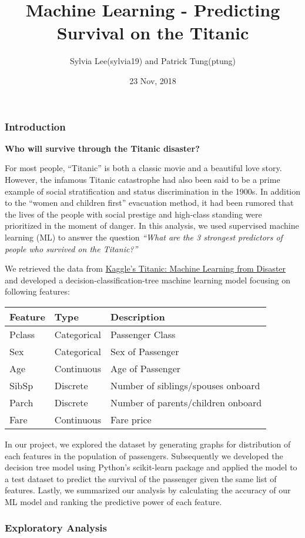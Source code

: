 \documentclass[]{article}
\title{Machine Learning - Predicting Survival on the Titanic}
\author{Sylvia Lee(sylvia19) and Patrick Tung(ptung)}
\date{23 Nov, 2018}
\begin{document}
\maketitle

\subsubsection{Introduction}\label{introduction}

\textbf{Who will survive through the Titanic disaster?}

For most people, ``Titanic'' is both a classic movie and a beautiful
love story. However, the infamous Titanic catastrophe had also been said
to be a prime example of social stratification and status discrimination
in the 1900s. In addition to the ``women and children first'' evacuation
method, it had been rumored that the lives of the people with social
prestige and high-class standing were prioritized in the moment of
danger. In this analysis, we used supervised machine learning (ML) to
answer the question \emph{``What are the 3 strongest predictors of
people who survived on the Titanic?''}

We retrieved the data from
\href{https://www.kaggle.com/c/titanic}{Kaggle's Titanic: Machine
Learning from Disaster} and developed a decision-classification-tree
machine learning model focusing on following features:

\begin{longtable}[]{@{}lll@{}}
\toprule
Feature & Type & Description\tabularnewline
\midrule
\endhead
Pclass & Categorical & Passenger Class\tabularnewline
Sex & Categorical & Sex of Passenger\tabularnewline
Age & Continuous & Age of Passenger\tabularnewline
SibSp & Discrete & Number of siblings/spouses onboard\tabularnewline
Parch & Discrete & Number of parents/children onboard\tabularnewline
Fare & Continuous & Fare price\tabularnewline
\bottomrule
\end{longtable}

In our project, we explored the dataset by generating graphs for
distribution of each features in the population of passengers.
Subsequently we developed the decision tree model using Python's
scikit-learn package and applied the model to a test dataset to predict
the survival of the passenger given the same list of features. Lastly,
we summarized our analysis by calculating the accuracy of our ML model
and ranking the predictive power of each feature.

\subsubsection{Exploratory Analysis}\label{exploratory-analysis}
\end{document}
